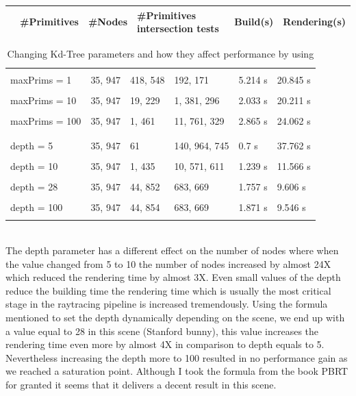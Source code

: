 \documentclass[11pt,a4paper]{article}
\newcommand\Includegraphics[2][]{\sbox{\mybox}{%
\texttt{[image: \#2]}}\abovebaseline[-.5\ht\mybox]{%
\addstackgap{\usebox{\mybox}}}}
\begin{document}
\begin{table}[ht] 
\centering 
{\footnotesize
\begin{tabular}{ P{2.5cm} ||P{2.3cm}  P{2.3cm}  P{2.3cm} P{2.3cm}  P{2.3cm}}      %
\hline\hline                                      %
\Includegraphics[height=1in]{images/stanford-bunny-black.png}
& \#Primitives  & \#Nodes & \#Primitives intersection tests & Build(s) & Rendering(s) \\ [0.5ex] %
\hline
    \end{tabular}
}
\end{table}
\vspace{-2em}
\begin{table}[ht] 
\centering 
{\footnotesize
\begin{tabular}{ P{2.5cm} ||P{2.3cm}  P{2.3cm}  P{2.3cm} P{2.3cm}  P{2.3cm} }      %
 \hline
\\
maxPrims = 1& 35, 947 & 418, 548 & 192, 171 &  5.214 s & 20.845 s\\
\\
maxPrims = 10& 35, 947 & 19, 229 & 1, 381, 296 & 2.033 s & 20.211 s\\
\\
maxPrims = 100& 35, 947 & 1, 461 & 11, 761, 329 & 2.865 s & 24.062 s\\
\\
\hline \hline
\\
depth = 5 & 35, 947 & 61 & 140, 964, 745 &  0.7 s & 37.762 s \\
\\
depth = 10& 35, 947 & 1, 435 & 10, 571, 611 & 1.239 s & 11.566 s\\
\\
depth = 28& 35, 947 & 44, 852 & 683, 669 & 1.757 s & 9.606 s\\
\\
depth = 100& 35, 947 & 44, 854 & 683, 669 & 1.871 s & 9.546 s\\
\\
\hline \hline
    \end{tabular}
}
  \captionsetup{justification=centering,margin=2cm}
  \caption{Changing Kd-Tree parameters and how they affect performance by using \protect\cite{stanfordbunny}}
\end{table}

\noindent
\\
The depth parameter has a different effect on the number of nodes where when the value changed from 5 to 10 the number of nodes increased by almost 24X which reduced the rendering time by almost 3X.  Even small values of the depth reduce the building time the rendering time which is usually the most critical stage in the raytracing pipeline is increased tremendously. Using the formula mentioned to set the depth dynamically depending on the scene, we end up with a value equal to 28 in this scene (Stanford bunny), this value increases the rendering time even more by almost 4X in comparison to depth equals to 5. Nevertheless increasing the depth more to 100 resulted in no performance gain as we reached a saturation point. Although I took the formula from the book PBRT for granted it seems that it delivers a decent result in this scene. 
\end{document}
